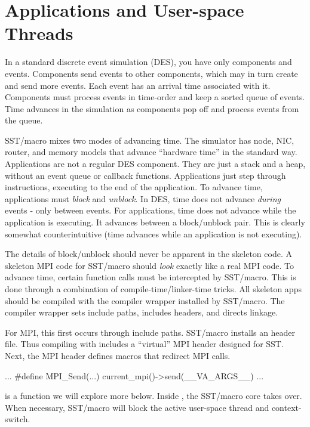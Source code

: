 \section{Applications and User-space Threads}
\label{sec:appThreads}

In a standard discrete event simulation (DES), you have only components and events.
Components send events to other components, which may in turn create and send more events.
Each event has an arrival time associated with it.
Components must process events in time-order and keep a sorted queue of events.
Time advances in the simulation as components pop off and process events from the queue.

SST/macro mixes two modes of advancing time.
The simulator has node, NIC, router, and memory models that advance ``hardware time'' in the standard way.
Applications are not a regular DES component.
They are just a stack and a heap, without an event queue or  callback functions.
Applications just step through instructions, executing to the end of the application.
To advance time, applications must \emph{block} and \emph{unblock}.
In DES, time does not advance \emph{during} events - only between events.
For applications, time does not advance while the application is executing.
It advances between a block/unblock pair.
This is clearly somewhat counterintuitive (time advances while an application is not executing).

The details of block/unblock should never be apparent in the skeleton code.
A skeleton MPI code for SST/macro should \emph{look} exactly like a real MPI code.
To advance time, certain function calls must be intercepted by SST/macro.
This is done through a combination of compile-time/linker-time tricks.
All skeleton apps should be compiled with the  compiler wrapper installed by SST/macro.
The compiler wrapper sets include paths, includes headers, and directs linkage.

For MPI, this first occurs through include paths. SST/macro installs an  header file.
Thus compiling with  includes a ``virtual'' MPI header designed for SST.
Next, the MPI header defines macros that redirect MPI calls.

\begin{CppCode}
...
#define MPI_Send(...) current_mpi()->send(__VA_ARGS__)
...
\end{CppCode}
 is a function we will explore more below.
Inside , the SST/macro core takes over.
When necessary, SST/macro will block the active user-space thread and context-switch.

